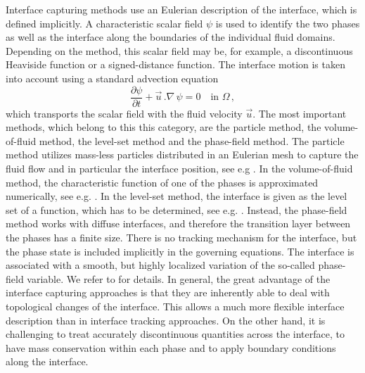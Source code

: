 Interface capturing methods use an Eulerian description of the interface, which
is defined implicitly. A characteristic scalar field $\psi$ is used to identify
the two phases as well as the interface along the boundaries of the individual
fluid domains. Depending on the method, this scalar field may be, for example,
a discontinuous Heaviside function or a signed-distance function. The interface
motion is taken into account using a standard advection equation
\begin{equation}
\frac{\partial \psi}{\partial t}+\vec u\,.\nabla\,\psi=0 \quad \mbox{in }
\Omega\,,
\end{equation}
which transports the scalar field with the fluid velocity $\vec u$. The most
important methods, which belong to this this category, are the particle method,
the volume-of-fluid method, the level-set method and the phase-field method.
The particle method utilizes mass-less particles distributed in an Eulerian
mesh to capture the fluid flow and in particular the interface position, see
e.g \cite{Girault1976}. In the volume-of-fluid method, the characteristic
function of one of the phases is approximated numerically, see e.g.
\cite{HirtN81,RenardyR02,Popinet09}. In the level-set method, the interface is
given as the level set of a function, which has to be determined, see e.g.
\cite{SussmanSO94,Sethian99,OsherF03,GrossR07}. Instead, the phase-field method
works with diffuse interfaces, and therefore the transition layer between the
phases has a finite size. There is no tracking mechanism for the interface, but
the phase state is included implicitly in the governing equations. The
interface is associated with a smooth, but highly localized variation of the
so-called phase-field variable. We refer to
\cite{HohenbergH77,AndersonMW98,LowengrubT98,Feng06,KaySW08,AbelsGG12,GrunK14}
for details. In general, the great advantage of the interface capturing
approaches is that they are inherently able to deal with topological changes of
the interface. This allows a much more flexible interface description than in
interface tracking approaches. On the other hand, it is challenging to treat
accurately discontinuous quantities across the interface, to have mass
conservation within each phase and to apply boundary conditions along the
interface.


